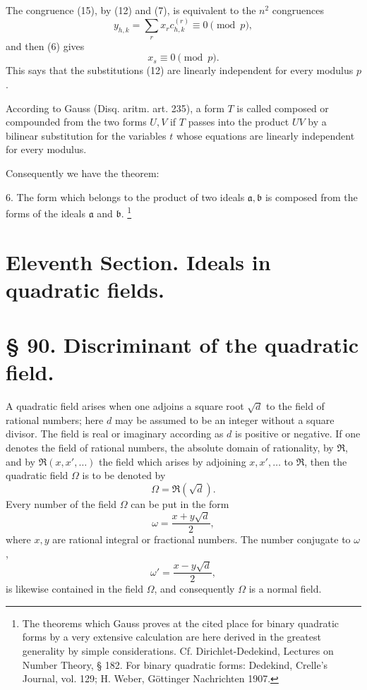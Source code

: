 \documentclass[11pt]{article}
\begin{document}
The congruence (15), by (12) and (7), is equivalent to the $n^2$ congruences
\[
 y_{h,k}=\sum_r x_rc_{h,k}^{(r)}\equiv0\pmod p,
\]
and then (6) gives
\[
 x_s\equiv0\pmod p.
\]
This says that the substitutions (12) are linearly independent for every modulus $p$.

According to Gauss (Disq. aritm. art. 235), a form $T$ is called composed or compounded from the two forms $U,V$ if $T$ passes into the product $UV$ by a bilinear substitution for the variables $t$ whose equations are linearly independent for every modulus.

Consequently we have the theorem:

6. The form which belongs to the product of two ideals $\mathfrak a,\mathfrak b$ is composed from the forms of the ideals $\mathfrak a$ and $\mathfrak b$.
\footnote{The theorems which Gauss proves at the cited place for binary quadratic forms by a very extensive calculation are here derived in the greatest generality by simple considerations. Cf. Dirichlet-Dedekind, Lectures on Number Theory, § 182. For binary quadratic forms: Dedekind, Crelle's Journal, vol. 129; H. Weber, Göttinger Nachrichten 1907.}




\section*{Eleventh Section. Ideals in quadratic fields.}

\section*{§ 90. Discriminant of the quadratic field.}

A quadratic field arises when one adjoins a square root $\sqrt d$ to the field of rational numbers; here $d$ may be assumed to be an integer without a square divisor. The field is real or imaginary according as $d$ is positive or negative. If one denotes the field of rational numbers, the absolute domain of rationality, by $\mathfrak R$, and by $\mathfrak R(x,x',\ldots)$ the field which arises by adjoining $x,x',\ldots$ to $\mathfrak R$, then the quadratic field $\Omega$ is to be denoted by
\begin{equation}
 \Omega=\mathfrak R(\sqrt d).
\tag{1}
\end{equation}
Every number of the field $\Omega$ can be put in the form
\begin{equation}
 \omega=\frac{x+y\sqrt d}{2},
\tag{2}
\end{equation}
where $x,y$ are rational integral or fractional numbers. The number conjugate to $\omega$,
\begin{equation}
 \omega'=\frac{x-y\sqrt d}{2},
\tag{3}
\end{equation}
is likewise contained in the field $\Omega$, and consequently $\Omega$ is a normal field.
\end{document}
